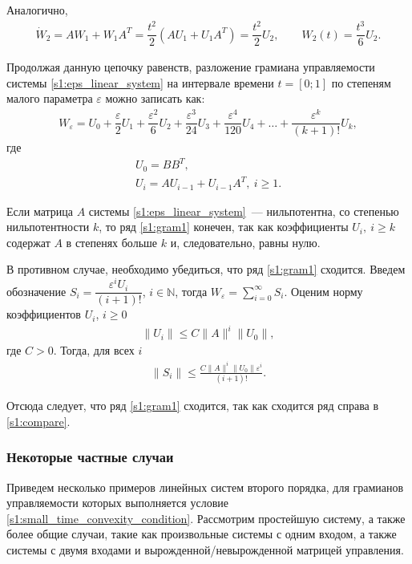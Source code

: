 \documentclass[../main.tex]{subfiles}
\begin{document}
Аналогично,
\begin{gather*}
 \dot{W}_2 = A W_1 + W_1 A^T = \dfrac{t^2}{2} \left( A U_1 + U_1 A^T \right) = \dfrac{t^2}{2} U_2, \qquad W_2(t) = \dfrac{t^3}{6}U_2.
\end{gather*}
 
Продолжая данную цепочку равенств, разложение грамиана управляемости системы \eqref{s1:eps_linear_system} на интервале времени $t = [0;1] $ по степеням малого параметра $ \varepsilon $ можно записать как:
\begin{gather}\label{s1:gram1}
 W_{\varepsilon} = U_0 + \dfrac{\varepsilon}{2}U_1 + \dfrac{\varepsilon^2}{6} U_2 + \dfrac{\varepsilon^3}{24}U_3 + \dfrac{\varepsilon^4}{120}U_4 + \dots + \dfrac{\varepsilon^k}{(k+1)!}U_k,
\end{gather}
где
\begin{gather*}
 U_0 = B B^T, \\
 U_i = A U_{i-1} + U_{i-1} A^T, \ i \geqslant 1.
\end{gather*}
 
Если матрица $ A $ системы \eqref{s1:eps_linear_system}~--- нильпотентна, со степенью нильпотентности $ k $, то ряд \eqref{s1:gram1} конечен, так как коэффициенты $ U_i, \ i \geqslant k$ содержат $ A $ в степенях больше $ k$ и, следовательно, равны нулю.

В противном случае, необходимо убедиться, что ряд \eqref{s1:gram1} сходится. 
Введем обозначение $ S_i = \dfrac{\varepsilon^i U_i}{(i + 1)!} $, $i \in \mathbb{N}$, тогда $W_{\varepsilon} = \sum\limits_{i = 0}^{\infty} S_i$.
Оценим норму коэффициентов $ U_i $, $ i \geqslant 0$
\begin{gather*}
	\| U_i \| \leqslant C \|A\|^i \|U_0\|, 
\end{gather*}
где $C > 0$. 
Тогда, для всех $i$
\begin{gather}\label{s1:compare}
		\|S_i\| \leqslant \frac{C \|A\|^i \|U_0\| \varepsilon^i}{(i + 1)!}.
\end{gather} 
 
 Отсюда следует, что ряд \eqref{s1:gram1} сходится, так как сходится ряд справа в \eqref{s1:compare}.
 
\subsubsection{Некоторые частные случаи}
\label{s1:examples}
Приведем несколько примеров линейных систем второго порядка, для грамианов управляемости которых выполняется условие \eqref{s1:small_time_convexity_condition}.
Рассмотрим простейшую систему, а также более общие случаи, такие как произвольные системы с одним входом, а также системы с двумя входами и вырожденной/невырожденной матрицей управления.
\end{document}

